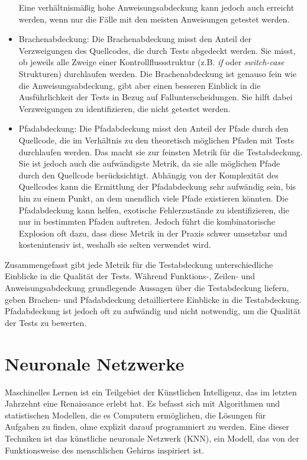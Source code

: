 \begin{itemize}
    Eine verhältnismäßig hohe Anweisungsabdeckung kann jedoch auch erreicht werden, wenn nur die Fälle mit den meisten Anweisungen getestet werden.
    \item 
    Brachenabdeckung: Die Brachenabdeckung misst den Anteil der Verzweigungen des Quellcodes, die durch Tests abgedeckt werden.
    Sie misst, ob jeweils alle Zweige einer Kontrollflussstruktur (z.B. \textit{if} oder \textit{switch-case} Strukturen) durchlaufen werden.
    Die Brachenabdeckung ist genauso fein wie die Anweisungsabdeckung, gibt aber einen besseren Einblick in die Ausführlichkeit der Tests in Bezug auf Fallunterscheidungen.
    Sie hilft dabei Verzweigungen zu identifizieren, die nicht getestet werden.
    \item
    Pfadabdeckung: Die Pfadabdeckung misst den Anteil der Pfade durch den Quellcode, die im Verhältnis zu den theoretisch möglichen Pfaden mit Tests durchlaufen werden.
    Das macht sie zur feinsten Metrik für die Testabdeckung.
    Sie ist jedoch auch die aufwändigste Metrik, da sie alle möglichen Pfade durch den Quellcode berücksichtigt.
    Abhängig von der Komplexität des Quellcodes kann die Ermittlung der Pfadabdeckung sehr aufwändig sein, bis hin zu einem Punkt, an dem unendlich viele Pfade existieren könnten.
    Die Pfadabdeckung kann helfen, exotische Fehlerzustände zu identifizieren, die nur in bestimmten Pfaden auftreten.
    Jedoch führt die kombinatorische Explosion oft dazu, dass diese Metrik in der Praxis schwer umsetzbar und kostenintensiv ist, weshalb sie selten verwendet wird.

\end{itemize}

Zusammengefasst gibt jede Metrik für die Testabdeckung unterschiedliche Einblicke in die Qualität der Tests.
Während Funktions-, Zeilen- und Anweisungsabdeckung grundlegende Aussagen über die Testabdeckung liefern, geben Brachen- und Pfadabdeckung detailliertere Einblicke in die Testabdeckung.
Pfadabdeckung ist jedoch oft zu aufwändig und nicht notwendig, um die Qualität der Tests zu bewerten.

\section{Neuronale Netzwerke}
\label{subsec:Foundations:NeuralNetworks}

Maschinelles Lernen ist ein Teilgebiet der Künstlichen Intelligenz, das im letzten Jahrzehnt eine Renaissance erlebt hat.
Es befasst sich mit Algorithmen und statistischen Modellen, die es Computern ermöglichen, die Lösungen für Aufgaben zu finden, ohne explizit darauf programmiert zu werden.
Eine dieser Techniken ist das künstliche neuronale Netzwerk (KNN), ein Modell, das von der Funktionsweise des menschlichen Gehirns inspiriert ist.

